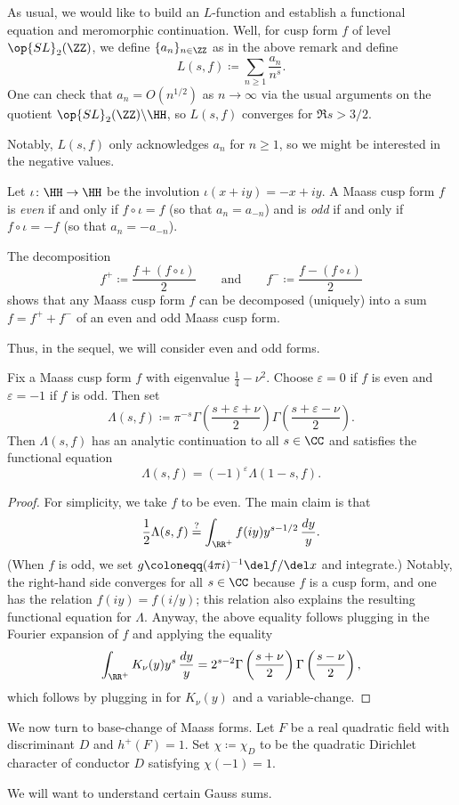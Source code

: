 \documentclass{article}
\begin{document}
As usual, we would like to build an $L$-function and establish a functional equation and meromorphic continuation. Well, for cusp form $f$ of level $\op{SL}_2(\ZZ)$, we define $\{a_n\}_{n\in\ZZ}$ as in the above remark and define
\[L(s,f)\coloneqq\sum_{n\ge1}\frac{a_n}{n^s}.\]
One can check that $a_n=O\left(n^{1/2}\right)$ as $n\to\infty$ via the usual arguments on the quotient $\op{SL}_2(\ZZ)\backslash\HH$, so $L(s,f)$ converges for $\Re s>3/2$.

Notably, $L(s,f)$ only acknowledges $a_n$ for $n\ge1$, so we might be interested in the negative values.
\begin{definition}
	Let $\iota\colon\HH\to\HH$ be the involution $\iota(x+iy)=-x+iy$. A Maass cusp form $f$ is \textit{even} if and only if $f\circ\iota=f$ (so that $a_n=a_{-n}$) and is \textit{odd} if and only if $f\circ\iota=-f$ (so that $a_n=-a_{-n}$).
\end{definition}
\begin{remark}
	The decomposition
	\[f^+\coloneqq\frac{f+(f\circ\iota)}2\qquad\text{and}\qquad f^-\coloneqq\frac{f-(f\circ\iota)}2\]
	shows that any Maass cusp form $f$ can be decomposed (uniquely) into a sum $f=f^++f^-$ of an even and odd Maass cusp form.
\end{remark}
Thus, in the sequel, we will consider even and odd forms.
\begin{proposition}
	Fix a Maass cusp form $f$ with eigenvalue $\frac14-\nu^2$. Choose $\varepsilon=0$ if $f$ is even and $\varepsilon=-1$ if $f$ is odd. Then set
	\[\Lambda(s,f)\coloneqq\pi^{-s}\Gamma\left(\frac{s+\varepsilon+\nu}2\right)\Gamma\left(\frac{s+\varepsilon-\nu}2\right).\]
	Then $\Lambda(s,f)$ has an analytic continuation to all $s\in\CC$ and satisfies the functional equation
	\[\Lambda(s,f)=(-1)^\varepsilon\Lambda(1-s,f).\]
\end{proposition}
\begin{proof}
	For simplicity, we take $f$ to be even. The main claim is that
	\[\frac12\Lambda(s,f)\stackrel?=\int_{\RR^+}f(iy)y^{s-1/2}\,\frac{dy}y.\]
	(When $f$ is odd, we set $g\coloneqq(4\pi i)^{-1}\del f/\del x$ and integrate.) Notably, the right-hand side converges for all $s\in\CC$ because $f$ is a cusp form, and one has the relation $f(iy)=f(i/y)$; this relation also explains the resulting functional equation for $\Lambda$. Anyway, the above equality follows plugging in the Fourier expansion of $f$ and applying the equality
	\[\int_{\RR^+}K_\nu(y)y^s\,\frac{dy}y=2^{s-2}\Gamma\left(\frac{s+\nu}2\right)\Gamma\left(\frac{s-\nu}2\right),\]
	which follows by plugging in for $K_\nu(y)$ and a variable-change.
\end{proof}
We now turn to base-change of Maass forms. Let $F$ be a real quadratic field with discriminant $D$ and $h^+(F)=1$. Set $\chi\coloneqq\chi_D$ to be the quadratic Dirichlet character of conductor $D$ satisfying $\chi(-1)=1$.

We will want to understand certain Gauss sums. 
\end{document}
